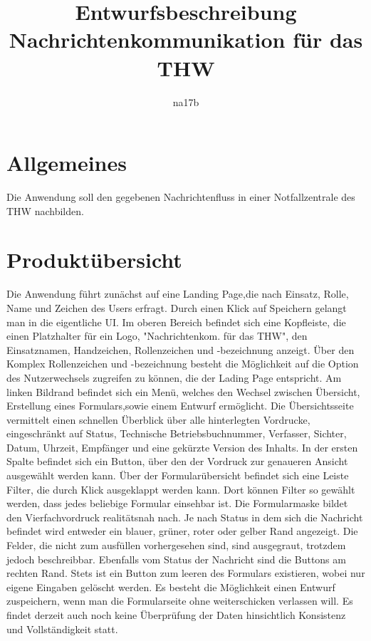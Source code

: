 \documentclass[a4paper,11pt,oneside, titlepage]{article}
\title{Entwurfsbeschreibung\\Nachrichtenkommunikation für das THW}
\author{na17b}
\date{}
\begin{document}
\maketitle


\tableofcontents


\newpage


\section{Allgemeines}
Die Anwendung soll den gegebenen Nachrichtenfluss in einer Notfallzentrale des THW nachbilden.
\section{Produktübersicht}
Die Anwendung führt zunächst auf eine Landing Page,die nach Einsatz, Rolle, Name und Zeichen des Users erfragt. Durch einen Klick auf Speichern gelangt man in die eigentliche UI. Im oberen Bereich befindet sich eine Kopfleiste, die einen Platzhalter für ein Logo, "Nachrichtenkom. für das THW", den Einsatznamen, Handzeichen, Rollenzeichen und -bezeichnung anzeigt. Über den Komplex Rollenzeichen und -bezeichnung besteht die Möglichkeit auf die Option des Nutzerwechsels zugreifen zu können, die der Lading Page entspricht. Am linken Bildrand befindet sich ein Menü, welches den Wechsel zwischen Übersicht, Erstellung eines Formulars,sowie einem Entwurf ermöglicht. Die Übersichtsseite vermittelt einen schnellen Überblick über alle hinterlegten Vordrucke, eingeschränkt auf Status, Technische Betriebsbuchnummer, Verfasser, Sichter, Datum, Uhrzeit, Empfänger und eine gekürzte Version des Inhalts. In der ersten Spalte befindet sich ein Button, über den der Vordruck zur genaueren Ansicht ausgewählt werden kann. Über der Formularübersicht befindet sich eine Leiste Filter, die durch Klick ausgeklappt werden kann. Dort können Filter so gewählt werden, dass jedes beliebige Formular einsehbar ist. Die Formularmaske bildet den Vierfachvordruck realitätsnah nach. Je nach Status in dem sich die Nachricht befindet wird entweder ein blauer, grüner, roter oder gelber Rand angezeigt. Die Felder, die nicht zum ausfüllen vorhergesehen sind, sind ausgegraut, trotzdem jedoch beschreibbar. Ebenfalls vom Status der Nachricht sind die Buttons am rechten Rand. Stets ist ein Button zum leeren des Formulars existieren, wobei nur eigene Eingaben gelöscht werden. Es besteht die Möglichkeit einen Entwurf zuspeichern, wenn man die Formularseite ohne weiterschicken verlassen will. Es findet derzeit auch noch keine Überprüfung der Daten hinsichtlich Konsistenz und Vollständigkeit statt. 
\end{document}
